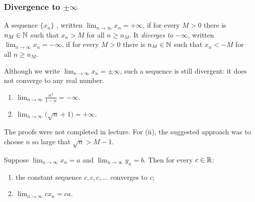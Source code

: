 \subsubsection*{Divergence to \texorpdfstring{$\pm\infty$}{plus or minus infinity}}
\begin{defi}
  A sequence $\{x_n\}$ , written
  $\lim_{n \to \infty} x_n = +\infty$, if for every $M > 0$ there is
  $n_M \in \mathbb{N}$ such that $x_n > M$ for all $n \geq n_M$. It
  \emph{diverges to $-\infty$}, written $\lim_{n \to \infty} x_n = -\infty$,
  if for every $M > 0$ there is $n_M \in \mathbb{N}$ such that $x_n < -M$ for all
  $n \geq n_M$.
\end{defi}

\begin{warning}
  Although we write $\lim_{n \to \infty} x_n = \pm\infty$, such a sequence
  is still divergent: it does not converge to any real number.
\end{warning}

\begin{eg}\leavevmode
  \begin{enumerate}
    \item $\lim_{n \to \infty} \frac{n^2}{1 - n} = -\infty$.
    \item $\lim_{n \to \infty} \bigl(\sqrt{n} + 1\bigr) = +\infty$.
  \end{enumerate}
  The proofs were not completed in lecture. For (ii), the suggested approach
  was to choose $n$ so large that $\sqrt{n} > M - 1$.
\end{eg}

\begin{thm}
  Suppose $\lim_{n \to \infty} x_n = a$ and $\lim_{n \to \infty} y_n = b$.
  Then for every $c \in \mathbb{R}$:
  \begin{enumerate}
    \item the constant sequence $c, c, c, \ldots$ converges to $c$;
    \item $\lim_{n \to \infty} c x_n = ca$.
  \end{enumerate}
\end{thm}
